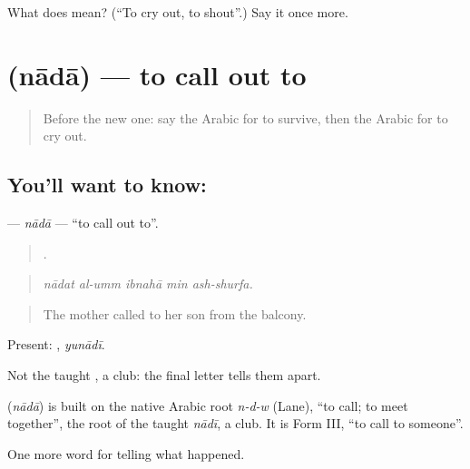 \begin{tcolorbox}[breakable,colback=teal!4,colframe=teal!35!black,title={Before you move on}]
What does  mean? (\textquotedblleft{}To cry out, to shout\textquotedblright{}.) Say it once more.
\end{tcolorbox}
\section[\texorpdfstring{\ar{نادى} (nādā)}{نادى (nādā)}]{ (nādā) — to call out to}

\label{lesson:AR-C310-nada}



\begin{quote}
Before the new one: say the Arabic for to survive, then the Arabic for to cry out.
\end{quote}

\subsection*{You'll want to know: }
\textbf{} — \emph{nādā} — \textquotedblleft{}to call out to\textquotedblright{}.

\begin{quote}
    .
\end{quote}

\begin{quote}
\emph{nādat al-umm ibnahā min ash-shurfa.}
\end{quote}

\begin{quote}
The mother called to her son from the balcony.
\end{quote}

Present: , \emph{yunādī}.

Not the taught , a club: the final letter tells them apart.

\begin{cousinweb}
\textbf{} (\emph{nādā}) is built on the native Arabic root \emph{n-d-w} (Lane), \textquotedblleft{}to call; to meet together\textquotedblright{}, the root of the taught \emph{nādī}, a club. It is Form III, \textquotedblleft{}to call to someone\textquotedblright{}.
\end{cousinweb}

\begin{grammarlens}[title={What you've built}]
One more word for telling what happened.
\end{grammarlens}

